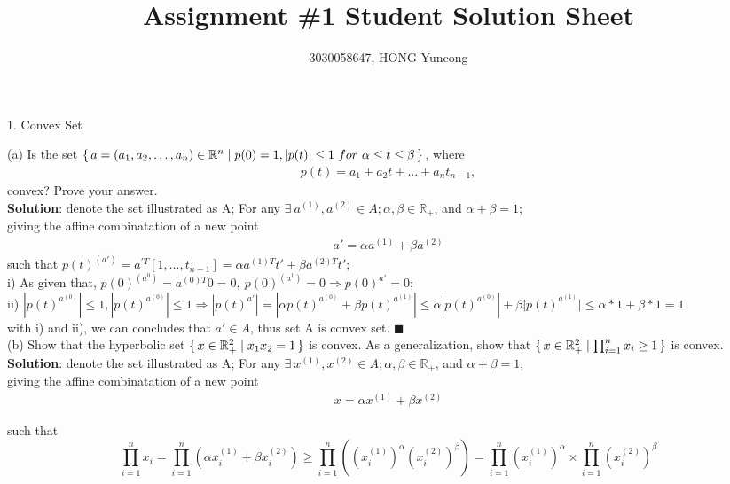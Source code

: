 \documentclass{article}
\title{Assignment \#1 Student Solution Sheet}
\author{3030058647, HONG Yuncong}
\begin{document}
\maketitle

1. Convex Set

(a) Is the set $\set{a=(a_1, a_2, \dots, a_n)\in\mathbb{R}^n|p(0)=1, |p(t)|\leq 1 \ for\ \alpha\leq t \leq\beta}$, where
\begin{align}
	p(t)=a_1+a_2 t+\dots+a_n t_{n-1},\nonumber
\end{align}
convex? Prove your answer. \\

\textbf{Solution}:
denote the set illustrated as A; For any $\exists \ a^{(1)}, a^{(2)} \in A; \alpha, \beta \in \mathbb{R}_+$, and $\alpha+\beta=1$; \\
giving the affine combinatation of a new point
\begin{align}
	a' = \alpha a^{(1)} + \beta a^{(2)} \nonumber
\end{align}
such that $p(t)^{(a')} = a^{'T}[1,\dots,t_{n-1}] = \alpha a^{(1)T}t' + \beta a^{(2)T}t'$; \\
i) As given that, $p(0)^{(a^0)} = a^{(0)T}0 = 0,\ p(0)^{(a^1)} = 0 \Rightarrow p(0)^{a'} = 0$; \\
ii) $|p(t)^{a^{(0)}}| \leq 1, |p(t)^{a^{(0)}}| \leq 1 \Rightarrow |p(t)^{a'}|=|\alpha p(t)^{a^{(0)}} + \beta p(t)^{a^{(1)}}| \leq {\alpha |p(t)^{a^{(0)}}| + \beta |p(t)^{a^{(1)}}}| \leq {\alpha*1 + \beta*1}=1$ \\
with i) and ii), we can concludes that $a' \in A$, thus set A is convex set. $\blacksquare$ \\

(b) Show that the hyperbolic set $\set{x \in \mathbb{R}^2_+ | x_1x_2=1}$ is convex. As a generalization, show that $\set{x \in \mathbb{R}^2_+ | \prod^n_{i=1}x_i \geq 1}$ is convex. \\

\textbf{Solution}:
denote the set illustrated as A; For any $\exists \ x^{(1)}, x^{(2)} \in A; \alpha, \beta \in \mathbb{R}_+$, and $\alpha+\beta=1$; \\
giving the affine combinatation of a new point
\begin{align}
	x = \alpha x^{(1)} + \beta x^{(2)} \nonumber
\end{align}

such that 
\[
	\prod^n_{i=1}x_i = \prod^n_{i=1}(\alpha x^{(1)}_i + \beta x^{(2)}_i) \geq \prod^n_{i=1}( (x^{(1)}_i)^\alpha (x^{(2)}_i)^\beta) = \prod^n_{i=1}(x^{(1)}_i)^\alpha \times \prod^n_{i=1}(x^{(2)}_i)^\beta
\]
\end{document}
